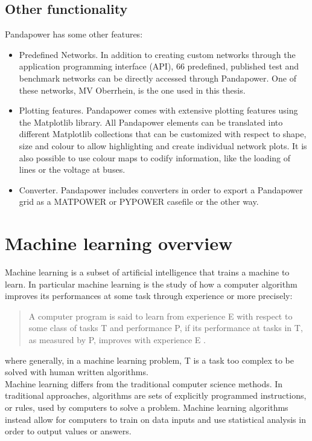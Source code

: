 \subsection{Other functionality}
Pandapower has some other features:
\begin{itemize}
    \item Predefined Networks. In addition to creating custom networks through the application programming interface (\gls{API}), 66 predefined, published test and benchmark networks can be directly accessed through Pandapower. One of these networks, MV Oberrhein, is the one used in this thesis.
    \item Plotting features. Pandapower comes with extensive plotting features using the Matplotlib library. All Pandapower elements can be translated into different Matplotlib collections that can be customized with respect to shape, size and colour to allow highlighting and create individual network plots. It is also possible to use colour maps to codify information, like the loading of lines or the voltage at buses.
    \item Converter. Pandapower includes converters in order to export a Pandapower grid as a MATPOWER or PYPOWER casefile or the other way.
\end{itemize}



\section{Machine learning overview}
\label{sec:ml}
Machine learning is a subset of artificial intelligence that trains a machine to learn. In particular machine learning is the study of how a computer algorithm improves its performances at some task through experience or more precisely:
\begin{quote}
    \centering
    A computer program is said to learn from experience E with respect to some class of tasks T and performance P, if its performance at tasks in T, as measured by P, improves with experience E \cite{mltm}.
\end{quote}
\noindent where generally, in a machine learning problem, T is a task too complex to be solved with human written algorithms.\\

Machine learning differs from the traditional computer science methods.  In traditional approaches, algorithms are sets of explicitly programmed instructions, or rules, used by computers to solve a problem. Machine learning algorithms instead allow for computers to train on data inputs and use statistical analysis in order to output values or answers. \\

